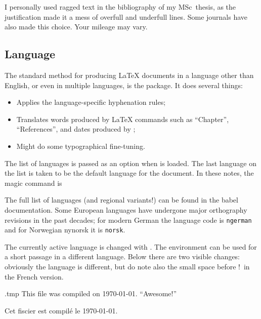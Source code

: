 I personally used ragged text in the bibliography of my MSc~thesis,
as the justification made it a mess of overfull and underfull lines.
Some journals have also made this choice.
Your mileage may vary.



%
%
\subsection{Language}

The standard method for producing \LaTeX{} documents in a language other than English,
or even in multiple languages, is the  package.
It does several things:
\begin{itemize}
    \item Applies the language-specific hyphenation rules;
    \item Translates words produced by \LaTeX{} commands such as ``Chapter'', ``References'',
        and dates produced by ;
    \item Might do some typographical fine-tuning.
\end{itemize}

The list of languages is passed as an option when  is loaded.
The last language on the list is taken to be the default language for the document.
In these notes, the magic command is
%
\begin{ExampleCode}
\usepackage[finnish,french,english]{babel}
\end{ExampleCode}
%
The full list of languages (and regional variants!) can be found in the babel documentation.
Some European languages have undergone major orthography revisions in the past decades;
for modern German the language code is \verb|ngerman|
and for Norwegian nynorsk it is \verb|norsk|.

The currently active language is changed with .
The  environment can be used for a short passage in a different language.
Below there are two visible changes:
obviously the language is different, but do note also the small space before !\ in the French version.
\begin{VerbatimOut}{\jobname.tmp}
This file was compiled on \today.
``Awesome!''\\

\begin{otherlanguage}{french}
Cet fiscier est compilé le \today.
\end{otherlanguage}
\end{VerbatimOut}
\ShowExample

